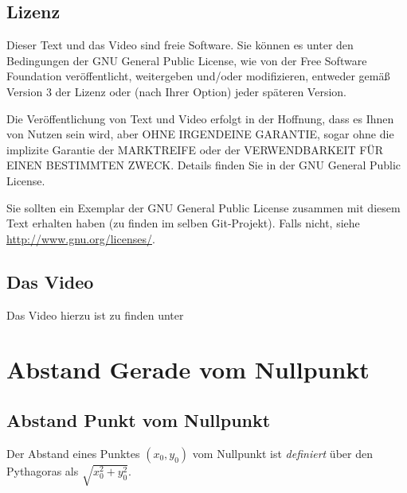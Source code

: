 \documentclass[a4paper]{amsart}
\theoremstyle{definition}
\begin{document}
\subsection*{Lizenz}
Dieser Text und das Video sind freie Software. Sie können es unter den Bedingungen der 
GNU General Public License, wie von der Free Software Foundation veröffentlicht, weitergeben 
und/oder modifizieren, entweder gemäß Version 3 der Lizenz oder (nach Ihrer Option) jeder späteren Version.

Die Veröffentlichung von Text und Video erfolgt in der Hoffnung, dass es Ihnen von Nutzen sein wird, 
aber OHNE IRGENDEINE GARANTIE, sogar ohne die implizite Garantie der MARKTREIFE oder der 
VERWENDBARKEIT FÜR EINEN BESTIMMTEN ZWECK. Details finden Sie in der GNU General Public License.

Sie sollten ein Exemplar der GNU General Public License zusammen mit diesem Text erhalten haben 
(zu finden im selben Git-Projekt). 
Falls nicht, siehe \url{http://www.gnu.org/licenses/}.

\subsection*{Das Video}
Das Video hierzu ist zu finden unter 
{\tiny
   \url{}
}

\section{Abstand Gerade vom Nullpunkt}

\subsection{Abstand Punkt vom Nullpunkt}
Der Abstand eines Punktes $(x_0, y_0)$ vom Nullpunkt ist \emph{definiert} über den Pythagoras als
$\sqrt{x_0^2 + y_0^2}$.
\end{document}
